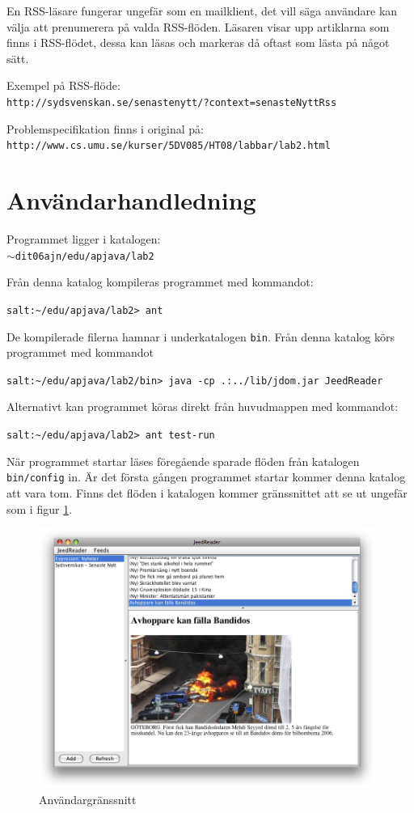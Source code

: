 \documentclass[a4paper, 12pt]{article}
\def\pathtocode{$\sim$dit06ajn/edu/apjava/lab2}
\begin{document}
En RSS-läsare fungerar ungefär som en mailklient, det vill säga
användare kan välja att prenumerera på valda RSS-flöden. Läsaren visar
upp artiklarna som finns i RSS-flödet, dessa kan läsas och markeras då
oftast som lästa på något sätt.

Exempel på RSS-flöde:\\
\verb!http://sydsvenskan.se/senastenytt/?context=senasteNyttRss!

Problemspecifikation finns i original på:\\
\verb!http://www.cs.umu.se/kurser/5DV085/HT08/labbar/lab2.html!

\section{Användarhandledning}\label{Anvandarhandledning}
Programmet ligger i katalogen:\\
\texttt{\pathtocode}

Från denna katalog kompileras programmet med kommandot:

\verb!salt:~/edu/apjava/lab2> ant!

De kompilerade filerna hamnar i underkatalogen \verb!bin!. Från denna
katalog körs programmet med kommandot

\verb!salt:~/edu/apjava/lab2/bin> java -cp .:../lib/jdom.jar JeedReader!

Alternativt kan programmet köras direkt från huvudmappen med
kommandot:

\verb!salt:~/edu/apjava/lab2> ant test-run!

När programmet startar läses föregående sparade flöden från katalogen
\verb!bin/config! in. Är det första gången programmet startar kommer
denna katalog att vara tom. Finns det flöden i katalogen kommer
gränssnittet att se ut ungefär som i figur \ref{fig:gui-out}.

\begin{figure}[H]
  \begin{center}
    \includegraphics[width=110mm]{images/gui-out.png}
    \caption{Användargränssnitt}
    \label{fig:gui-out}
  \end{center}
\end{figure}
\end{document}
